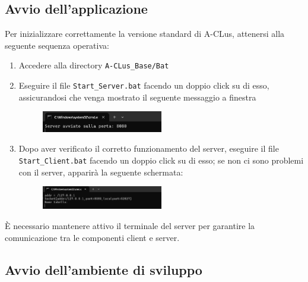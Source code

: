 \subsection{Avvio dell'applicazione}

Per inizializzare correttamente la versione standard di A-CLus, attenersi alla seguente sequenza operativa:


\begin{enumerate}
    \item Accedere alla directory \texttt{A-CLus\_Base/Bat}
    \item Eseguire il file \texttt{Start\_Server.bat} facendo un doppio click su di esso, assicurandosi che venga mostrato il seguente messaggio a finestra
    
    \begin{figure}[h!]
        \centering
        \includegraphics[width=0.5\textwidth]{images/server in esecuzione.png}
    \end{figure}

    \item Dopo aver verificato il corretto funzionamento del server, eseguire il file \texttt{Start\_Client.bat} facendo un doppio click su di esso; se non ci sono problemi con il server, apparirà la seguente schermata:
    
    \begin{figure}[h!]
        \centering
        \includegraphics[width=0.5\textwidth]{images/client in esecuzione.png}
        
    \end{figure}
    
\end{enumerate}

\begin{tcolorbox}[colback=white, colframe=gray, title=Avvertenza]
    È necessario mantenere attivo il terminale del server per garantire la comunicazione tra le componenti client e server.
\end{tcolorbox}

\subsection{Avvio dell'ambiente di sviluppo}

